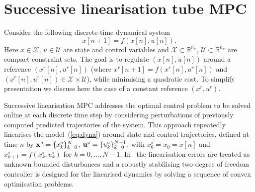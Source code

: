 \documentclass[a4paper, 10 pt, conference]{IEEEconf}
\def\RR{\mathbb{R}}
\def\S{\mathcal{S}}
\def\U{\mathcal{U}}
\def\X{\mathcal{X}}
\begin{document}




\section{Successive linearisation tube MPC}
\label{sec:TMPC}

Consider the following discrete-time dynamical system 
%
\begin{equation}
\label{eq:dyna}
x[n+1] = f(x[n], u[n]) .
\end{equation}
Here $x \in \X$, $u \in \U$ are state and control variables and $\X\subset\RR^{n_x}$, $\U\subset\RR^{n_u}$ are compact constraint sets. The goal is to regulate $(x[n],u[n])$ around a reference  $(x^r[n],u^r[n])$ (where ${x^r[n+1]} = f(x^r[n],u^r[n])$ and $(x^r[n],u^r[n])\in\X\times\U$), while minimising a quadratic cost. 
%
To simplify presentation we discuss here the case of a constant reference $(x^r,u^r)$.

%
Successive linearisation MPC addresses the optimal control problem to be solved online at each discrete time step by considering perturbations of previously computed predicted trajectories of the system.
% 
This approach repeatedly linearises the model~(\ref{eq:dyna}) around state and control trajectories, defined at time $n$ by ${\bf x}^\circ = \{x_k^\circ\}_{k=0}^N$, ${\bf u}^\circ=\{u_k^\circ\}_{k=0}^{N-1}$, with $x^\circ_0=x_0=x[n]$ and $x^\circ_{k+1} = f(x_k^\circ,u_k^\circ)$ for $k=0,\ldots,{N-1}$.
In~\cite{mark} the linearisation errors are treated as unknown bounded disturbances and a robustly stabilising two-degree of freedom controller is designed for the linearised dynamics by solving a sequence of convex optimisation problems.  
\end{document}
